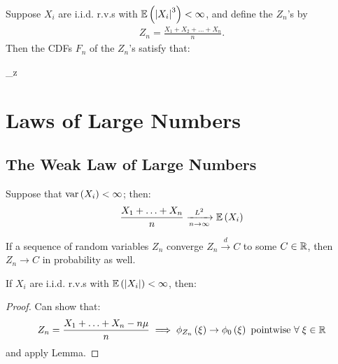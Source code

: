 \documentclass[12pt]{extarticle}
\begin{document}
\begin{theorem}
    Suppose $X_i$ are i.i.d. r.v.s with $\mathbb{E}\left(\left|X_i\right|^3\right)<\infty$, and define the $Z_n$'s by \begin{align*}
        Z_n=\frac{X_1+X_2+\hdots+X_n}{n}.
    \end{align*}
    Then the CDFs $F_n$ of the $Z_n$'s satisfy that: \begin{eqnbox}
        \sup_z\leq{}
    \end{eqnbox}
\end{theorem}

\pagebreak
\section{Laws of Large Numbers}
\subsection{The Weak Law of Large Numbers}
\begin{theorem}
    Suppose that $\text{var}\left(X_i\right)<\infty$; then: \begin{align*}
        \frac{X_1+\hdots+X_n}{n}\xrightarrow[n\to\infty]{L^2}\mathbb{E}\left(X_i\right)
    \end{align*}
\end{theorem}
\begin{lemma}
    If a sequence of random variables $Z_n$ converge $Z_n\xrightarrow{d}C$ to some $C\in\mathbb{R}$, then $Z_n\to C$ in probability as well.
\end{lemma}

\vspace{8pt}
\begin{tcolorbox}[colback=white]
    \begin{theorem}
       If $X_i$ are i.i.d. r.v.s with $\mathbb{E}\left(\left|X_i\right|\right)<\infty$, then: \begin{eqnbox}
       \end{eqnbox}
    \end{theorem}
\end{tcolorbox}
\begin{proof}
    Can show that: \begin{align*}
        Z_n=\frac{X_1+\hdots+X_n-n\mu}{n}\implies\phi_{Z_n}\left(\xi\right)\to\phi_{0}\left(\xi\right)\text{ pointwise $\forall\;\xi\in\mathbb{R}$}
    \end{align*}
    and apply Lemma.
\end{proof}
\end{document}
